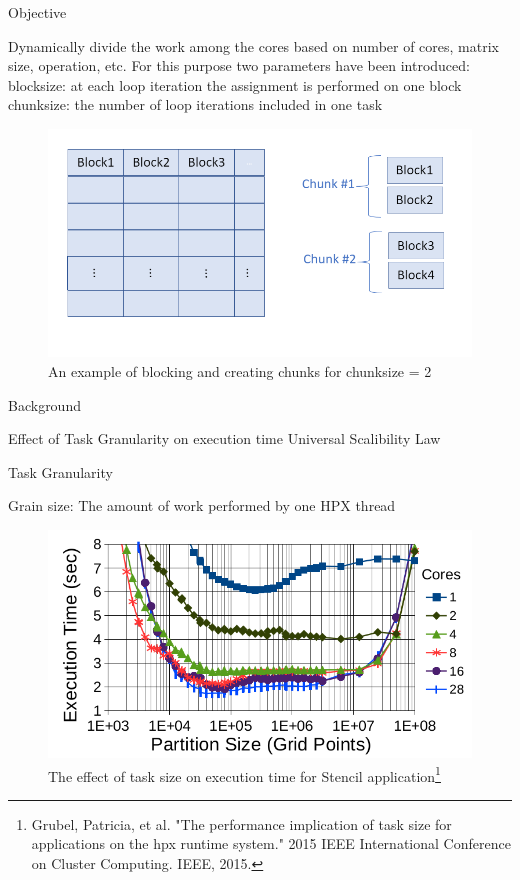\documentclass[10pt]{beamer}
\begin{document}
\begin{frame}{Objective}
	\begin{outline}
		Dynamically divide the work among the cores based on number of cores, matrix size, operation, etc.
		For this purpose two parameters have been introduced:
		\1block\textunderscore size: at each loop iteration the assignment is performed on one block
		\1chunk\textunderscore size: the number of loop iterations included in one task 
		\begin{figure}
			\centering
			\includegraphics[width=0.72\linewidth]{figures/chunks.png}
			\caption{An example of blocking and creating chunks for chunk\textunderscore size = 2}	
		\end{figure}	
	\end{outline}
\end{frame}


\begin{frame}{Background}
	\begin{outline}
		\1 Effect of Task Granularity on execution time
		\1 Universal Scalibility Law
	\end{outline}
\end{frame}


\begin{frame}{Task Granularity}
	\begin{outline}
		Grain size: The amount of work performed by one HPX thread
		\begin{figure}
			\centering
			\includegraphics[width=0.72\linewidth]{figures/task_granularity.png}
			\caption{The effect of task size on execution time for Stencil application\footnote{Grubel, Patricia, et al. "The performance implication of task size for applications on the hpx runtime system." 2015 IEEE International Conference on Cluster Computing. IEEE, 2015.}}	
	
		\end{figure}
		
	\end{outline}
\end{frame}
\end{document}
